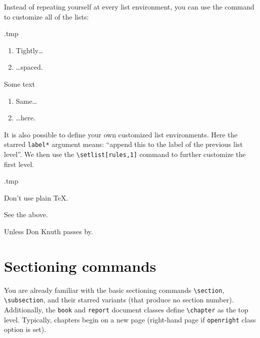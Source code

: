 Instead of repeating yourself at every list environment,
you can use the  command to customize all of the lists:
%
\begin{VerbatimOut}{\jobname.tmp}

\begin{enumerate}
\item Tightly\dots
\item \dots{}spaced.
\end{enumerate}

Some text

\begin{enumerate}
\item Same\dots
\item \dots{}here.
\end{enumerate}
\end{VerbatimOut}
\ShowExample

It is also possible to define your own customized list environments.
Here the starred \verb|label*| argument means: ``append this to the label of the previous list level''.
We then use the \verb|\setlist[rules,1]| command to further customize the first level.
\begin{VerbatimOut}{\jobname.tmp}

\begin{rules}
\item Don't use plain \TeX.
\item See the above.
\begin{rules}
\item Unless Don Knuth passes by.
\end{rules}
\end{rules}
\end{VerbatimOut}
\ShowExample


%
%
%
\section{Sectioning commands}\label{sec:sectioning}

You are already familiar with the basic sectioning commands
\verb|\section|, \verb|\subsection|, and their starred variants (that produce no section number).
Additionally, the \verb|book| and \verb|report| document classes
define \verb|\chapter| as the top level.
Typically, chapters begin on a new page (right-hand page if \verb|openright| class option is set).

